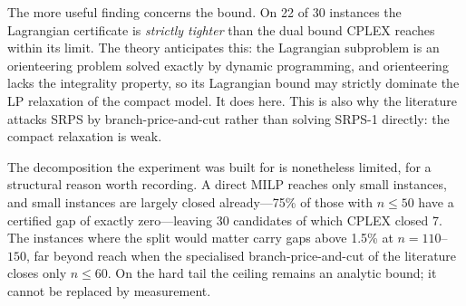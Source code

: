 The more useful finding concerns the bound. On 22 of 30 instances the Lagrangian certificate is \emph{strictly tighter} than the dual bound CPLEX reaches within its limit. The theory anticipates this: the Lagrangian subproblem is an orienteering problem solved exactly by dynamic programming, and orienteering lacks the integrality property, so its Lagrangian bound may strictly dominate the LP relaxation of the compact model. It does here. This is also why the literature attacks SRPS by branch-price-and-cut rather than solving SRPS-1 directly: the compact relaxation is weak.

The decomposition the experiment was built for is nonetheless limited, for a structural reason worth recording. A direct MILP reaches only small instances, and small instances are largely closed already---75\% of those with $n\le 50$ have a certified gap of exactly zero---leaving 30 candidates of which CPLEX closed 7. The instances where the split would matter carry gaps above 1.5\% at $n=110$--$150$, far beyond reach when the specialised branch-price-and-cut of the literature closes only $n\le 60$. On the hard tail the ceiling remains an analytic bound; it cannot be replaced by measurement.
